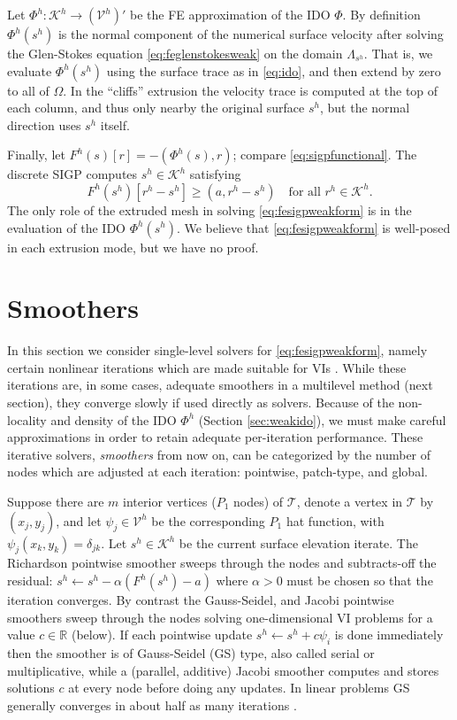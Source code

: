 \documentclass[letterpaper,final,12pt,reqno]{amsart}
\theoremstyle{claim}
\newcommand{\RR}{\mathbb{R}}
\newcommand{\ip}[2]{\left(#1,#2\right)}
\numberwithin{equation}{section}
\numberwithin{figure}{section}
\numberwithin{table}{section}
\numberwithin{theorem}{section}
\begin{document}
Let $\Phi^h:\mathcal{K}^h \to (\mathcal{V}^h)'$ be the FE approximation of the IDO $\Phi$.  By definition $\Phi^h(s^h)$ is the normal component of the numerical surface velocity after solving the Glen-Stokes equation \eqref{eq:feglenstokesweak} on the domain $\Lambda_{s^h}$.  That is, we evaluate $\Phi^h(s^h)$ using the surface trace as in \eqref{eq:ido}, and then extend by zero to all of $\Omega$.  In the ``cliffs'' extrusion the velocity trace is computed at the top of each column, and thus only nearby the original surface $s^h$, but the normal direction uses $s^h$ itself.

Finally, let $F^h(s)[r] = - \ip{\Phi^h(s)}{r}$; compare \eqref{eq:sigpfunctional}.  The discrete SIGP computes $s^h \in \mathcal{K}^h$ satisfying
\begin{equation}
F^h(s^h)[r^h - s^h] \ge \ip{a}{r^h-s^h} \quad \text{for all } r^h \in \mathcal{K}^h. \label{eq:fesigpweakform}
\end{equation}
The only role of the extruded mesh in solving \eqref{eq:fesigpweakform} is in the evaluation of the IDO $\Phi^h(s^h)$.  We believe that \eqref{eq:fesigpweakform} is well-posed in each extrusion mode, but we have no proof.


\section{Smoothers} \label{sec:smoothers}

In this section we consider single-level solvers for \eqref{eq:fesigpweakform}, namely certain nonlinear iterations which are made suitable for VIs \cite{KinderlehrerStampacchia1980}.  While these iterations are, in some cases, adequate smoothers in a multilevel method (next section), they converge slowly if used directly as solvers.  Because of the non-locality and density of the IDO $\Phi^h$ (Section \ref{sec:weakido}), we must make careful approximations in order to retain adequate per-iteration performance.  These iterative solvers, \emph{smoothers} from now on, can be categorized by the number of nodes which are adjusted at each iteration: pointwise, patch-type, and global.

Suppose there are $m$ interior vertices ($P_1$ nodes) of $\mathcal{T}$, denote a vertex in $\mathcal{T}$ by $(x_j,y_j)$, and let $\psi_j \in \mathcal{V}^h$ be the corresponding $P_1$ hat function, with $\psi_j(x_k,y_k)=\delta_{jk}$.  Let $s^h\in \mathcal{K}^h$ be the current surface elevation iterate.  The Richardson pointwise smoother sweeps through the nodes and subtracts-off the residual: $s^h \gets s^h - \alpha (F^h(s^h)-a)$ where $\alpha>0$ must be chosen so that the iteration converges.  By contrast the Gauss-Seidel, and Jacobi pointwise smoothers sweep through the nodes solving one-dimensional VI problems for a value $c\in \RR$ (below).  If each pointwise update $s^h \gets s^h + c \psi_i$ is done immediately then the smoother is of Gauss-Seidel (GS) type, also called serial or multiplicative, while a (parallel, additive) Jacobi smoother computes and stores solutions $c$ at every node before doing any updates.  In linear problems GS generally converges in about half as many iterations \cite{Greenbaum1997}.
\end{document}
